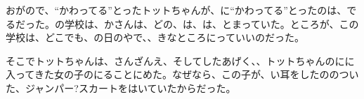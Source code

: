 おがので、“かわってる”とったトットちゃんが、に“かわってる”とったのは、でるだった。の学校は、かさんは、どの、は、は、とまっていた。ところが、この学校は、どこでも、の日のやで、、きなところにっていいのだった。

そこでトットちゃんは、さんざんえ、そしてしたあげく、、トットちゃんのにに入ってきた女の子のにることにめた。なぜなら、この子が、い耳をしたののついた、ジャンパー?スカートをはいていたからだった。

